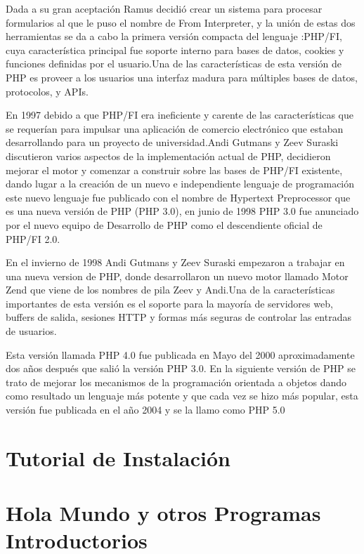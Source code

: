 \documentclass[11pt]{article} %
\begin{document}
Dada a su gran aceptación Ramus decidió crear  un sistema para procesar formularios al que le puso el nombre de From Interpreter, y la unión de estas dos herramientas  se da  a cabo  la primera versión compacta del lenguaje :PHP/FI, cuya característica principal fue soporte interno para bases de datos, cookies y funciones definidas por el usuario.Una de las características de esta versión de PHP es proveer a los usuarios  una interfaz madura para múltiples bases de datos, protocolos, y APIs.

En 1997 debido a que PHP/FI era ineficiente y carente de las características que se requerían para impulsar una aplicación de comercio electrónico que estaban desarrollando para un proyecto de universidad.Andi Gutmans y Zeev Suraski discutieron varios aspectos de la implementación actual de PHP, decidieron mejorar el motor y comenzar a construir sobre las bases de PHP/FI existente, dando lugar a la creación de un nuevo e independiente lenguaje de programación este nuevo lenguaje fue publicado con el nombre de Hypertext  Preprocessor que es una nueva versión de PHP (PHP 3.0), en junio de 1998  PHP 3.0 fue anunciado por el nuevo equipo de Desarrollo de PHP como el descendiente oficial de PHP/FI 2.0.

En el invierno de 1998 Andi Gutmans y Zeev Suraski empezaron a trabajar en una nueva version de PHP, donde desarrollaron un nuevo motor llamado Motor Zend que viene de los nombres de pila Zeev y Andi.Una de la características importantes de esta versión es el soporte para la mayoría de servidores web, buffers de salida, sesiones HTTP y formas más seguras de controlar las entradas de usuarios.


Esta versión llamada PHP 4.0 fue publicada en Mayo del 2000 aproximadamente  dos años después que salió la versión PHP 3.0.
En la siguiente versión de PHP se trato de mejorar los mecanismos de la programación orientada a objetos dando como resultado un lenguaje más potente y que cada vez se hizo más popular, esta versión fue publicada en el año 2004 y se la llamo como PHP 5.0 
 

\section{Tutorial de Instalación}

\section{Hola Mundo y otros Programas Introductorios}
\end{document}

